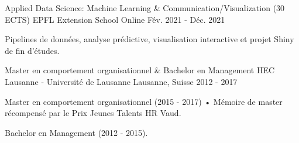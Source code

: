 \begin{cventries}
  \cventry
    {Applied Data Science: Machine Learning \& Communication/Visualization (30 ECTS)}
    {EPFL Extension School}
    {Online}
    {Fév. 2021 - Déc. 2021}
    {
      \begin{cvitems}
        \item {Pipelines de données, analyse prédictive, visualisation interactive et projet Shiny de fin d'études.}
      \end{cvitems}
    }

  \cventry
    {Master en comportement organisationnel \& Bachelor en Management}
    {HEC Lausanne - Université de Lausanne}
    {Lausanne, Suisse}
    {2012 - 2017}
    {
      \begin{cvitems}
        \item {Master en comportement organisationnel (2015 - 2017) • Mémoire de master récompensé par le Prix Jeunes Talents HR Vaud.}
        \item {Bachelor en Management (2012 - 2015).}
      \end{cvitems}
    }
\end{cventries}
